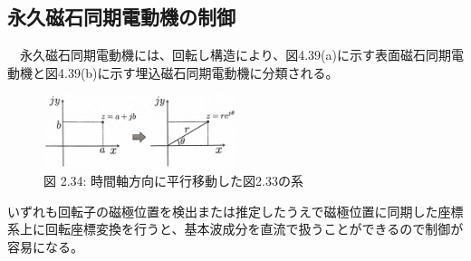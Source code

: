 \documentclass{article}
\begin{document}
\setcounter{subsection}{1}
\renewcommand{\thesubsection}{\thesection.\arabic{subsection}}

\subsection{永久磁石同期電動機の制御}
　永久磁石同期電動機には、回転し構造により、図4.39(a)に示す表面磁石同期電動機と図4.39(b)に示す埋込磁石同期電動機に分類される。

\begin{figure}[H]
    \centering
    \includegraphics[width=0.5\textwidth]{images/2_26.jpg}
    \caption{図 2.34: 時間軸方向に平行移動した図2.33の系}
    \label{fig:2.34}
\end{figure}

いずれも回転子の磁極位置を検出または推定したうえで磁極位置に同期した座標系上に回転座標変換を行うと、基本波成分を直流で扱うことができるので制御が容易になる。
　
\end{document}
